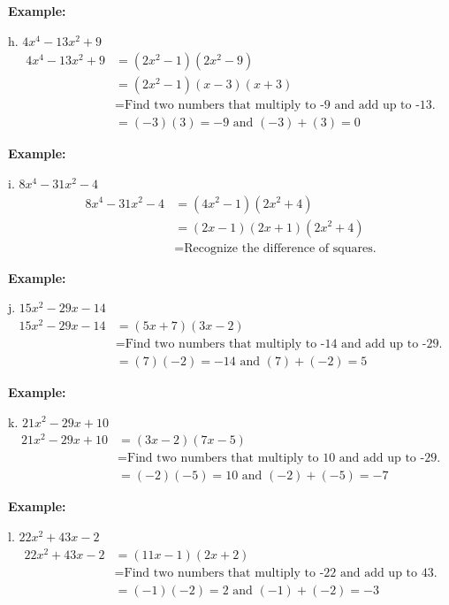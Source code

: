 \documentclass[12pt,a4paper]{article}
\newenvironment{example}
  {\begin{framed}\colorbox{examplecolor}{
  \parbox{\dimexpr\linewidth-2\fboxsep}{
  \textbf{Example:}}}}
  {\end{framed}}
\begin{document}
\newpage


\begin{example}
h. $4x^4 - 13x^2 + 9$
\begin{align*}
4x^4 - 13x^2 + 9 &= (2x^2 - 1)(2x^2 - 9) \\
&= (2x^2 - 1)(x - 3)(x + 3) \\
&= \text{Find two numbers that multiply to -9 and add up to -13.} \\
&= (-3)(3) = -9 \text{ and } (-3) + (3) = 0
\end{align*}
\end{example}

\begin{example}
i. $8x^4 - 31x^2 - 4$
\begin{align*}
8x^4 - 31x^2 - 4 &= (4x^2 - 1)(2x^2 + 4) \\
&= (2x - 1)(2x + 1)(2x^2 + 4) \\
&= \text{Recognize the difference of squares.}
\end{align*}
\end{example}

\begin{example}
j. $15x^2 - 29x - 14$
\begin{align*}
15x^2 - 29x - 14 &= (5x + 7)(3x - 2) \\
&= \text{Find two numbers that multiply to -14 and add up to -29.} \\
&= (7)(-2) = -14 \text{ and } (7) + (-2) = 5
\end{align*}
\end{example}

\begin{example}
k. $21x^2 - 29x + 10$
\begin{align*}
21x^2 - 29x + 10 &= (3x - 2)(7x - 5) \\
&= \text{Find two numbers that multiply to 10 and add up to -29.} \\
&= (-2)(-5) = 10 \text{ and } (-2) + (-5) = -7
\end{align*}
\end{example}

\begin{example}
l. $22x^2 + 43x - 2$
\begin{align*}
22x^2 + 43x - 2 &= (11x - 1)(2x + 2) \\
&= \text{Find two numbers that multiply to -22 and add up to 43.} \\
&= (-1)(-2) = 2 \text{ and } (-1) + (-2) = -3
\end{align*}
\end{example}
\newpage 
\end{document}
